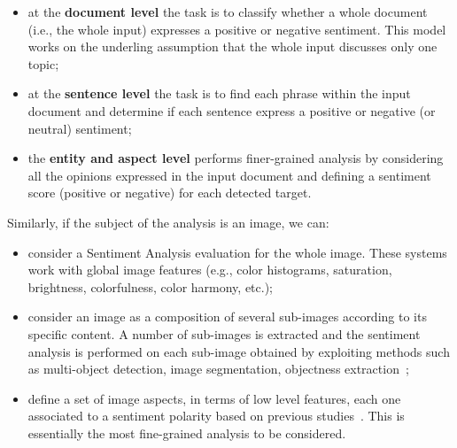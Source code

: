 \begin{itemize}
	\item at the \textbf{document level} the task is to classify whether a whole document (i.e., the whole input) expresses a positive or negative sentiment. This model works on the underling assumption that the whole input discusses only one topic;
	\item at the \textbf{sentence level} the task is to find each phrase within the input document and determine if each sentence express a positive or negative (or neutral) sentiment;
	\item the \textbf{entity and aspect level} performs finer-grained analysis by considering all the opinions expressed in the input document and defining a sentiment score (positive or negative) for each detected target.
\end{itemize}
Similarly, if the subject of the analysis is an image, we can:
\begin{itemize}
	\item consider a Sentiment Analysis evaluation for the whole image. These systems work with global image features (e.g., color histograms, saturation, brightness, colorfulness, color harmony, etc.);
	\item consider an image as a composition of several sub-images according to its specific content. A number of sub-images is extracted and the sentiment analysis is performed on each sub-image obtained by exploiting methods such as multi-object detection, image segmentation, objectness extraction~\cite{alexe2012measuring};
	\item define a set of image aspects, in terms of low level features, each one associated to a sentiment polarity based on previous studies~\cite{machajdik2010affective,yanulevskaya2008emotional}. %
	This is essentially the most fine-grained analysis to be considered.
\end{itemize}


